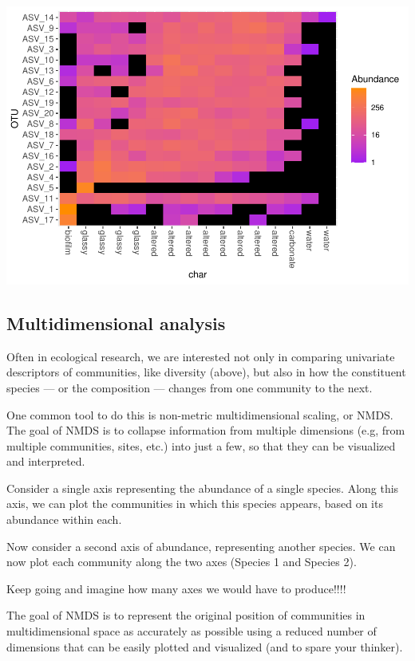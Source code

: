 \documentclass[
]{book}
\begin{document}
\includegraphics{bookdown-demo_files/figure-latex/unnamed-chunk-74-1.pdf}

\hypertarget{multidimensional-analysis}{%
\subsection{Multidimensional analysis}\label{multidimensional-analysis}}

Often in ecological research, we are interested not only in comparing univariate descriptors of communities, like diversity (above), but also in how the constituent species --- or the composition --- changes from one community to the next.

One common tool to do this is non-metric multidimensional scaling, or NMDS. The goal of NMDS is to collapse information from multiple dimensions (e.g, from multiple communities, sites, etc.) into just a few, so that they can be visualized and interpreted.

Consider a single axis representing the abundance of a single species. Along this axis, we can plot the communities in which this species appears, based on its abundance within each.

Now consider a second axis of abundance, representing another species. We can now plot each community along the two axes (Species 1 and Species 2).

Keep going and imagine how many axes we would have to produce!!!!

The goal of NMDS is to represent the original position of communities in multidimensional space as accurately as possible using a reduced number of dimensions that can be easily plotted and visualized (and to spare your thinker).
\end{document}

